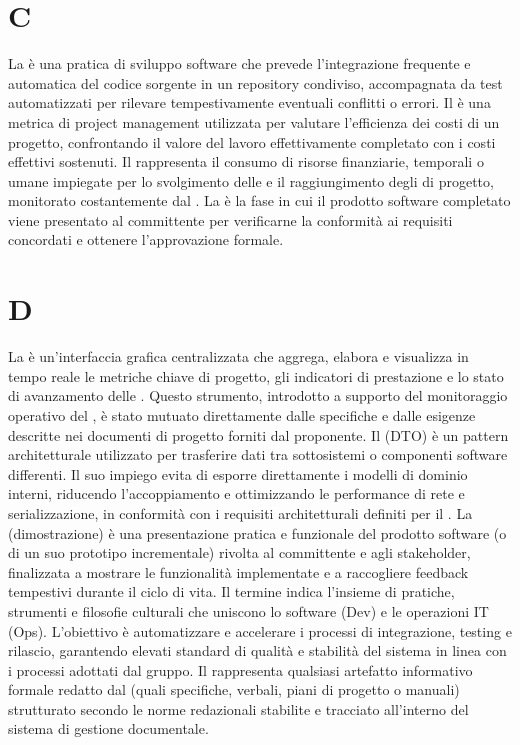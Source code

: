 \section{C}
La  è una pratica di sviluppo software che prevede l'integrazione frequente e automatica del codice sorgente in un repository condiviso, accompagnata da test automatizzati per rilevare tempestivamente eventuali conflitti o errori.
Il  è una metrica di project management utilizzata per valutare l'efficienza dei costi di un progetto, confrontando il valore del lavoro effettivamente completato con i costi effettivi sostenuti.
Il  rappresenta il consumo di risorse finanziarie, temporali o umane impiegate per lo svolgimento delle  e il raggiungimento degli  di progetto, monitorato costantemente dal .
La  è la fase in cui il prodotto software completato viene presentato al committente per verificarne la conformità ai requisiti concordati e ottenere l'approvazione formale.
\section{D}
La  è un'interfaccia grafica centralizzata che aggrega, elabora e visualizza in tempo reale le metriche chiave di progetto, gli indicatori di prestazione e lo stato di avanzamento delle . Questo strumento, introdotto a supporto del monitoraggio operativo del , è stato mutuato direttamente dalle specifiche e dalle esigenze descritte nei documenti di progetto forniti dal proponente.
Il  (DTO) è un pattern architetturale utilizzato per trasferire dati tra sottosistemi o componenti software differenti. Il suo impiego evita di esporre direttamente i modelli di dominio interni, riducendo l'accoppiamento e ottimizzando le performance di rete e serializzazione, in conformità con i requisiti architetturali definiti per il .
La  (dimostrazione) è una presentazione pratica e funzionale del prodotto software (o di un suo prototipo incrementale) rivolta al committente e agli stakeholder, finalizzata a mostrare le funzionalità implementate e a raccogliere feedback tempestivi durante il ciclo di vita.
Il termine  indica l'insieme di pratiche, strumenti e filosofie culturali che uniscono lo  software (Dev) e le operazioni IT (Ops). L'obiettivo è automatizzare e accelerare i processi di integrazione, testing e rilascio, garantendo elevati standard di qualità e stabilità del sistema in linea con i processi adottati dal gruppo.
Il  rappresenta qualsiasi artefatto informativo formale redatto dal  (quali specifiche, verbali, piani di progetto o manuali) strutturato secondo le norme redazionali stabilite e tracciato all'interno del sistema di gestione documentale.
